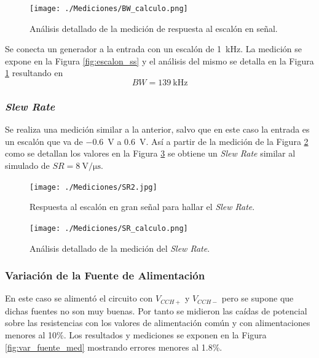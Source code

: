 		\begin{figure}[h!]
			\centering
			\texttt{[image: ./Mediciones/BW\_calculo.png]}
			\caption{Análisis detallado de la medición de respuesta al escalón en señal.}
			\label{fig:analisis_escalon_ss}
		\end{figure}

		Se conecta un generador a la entrada con un escalón de \SI{1}{\kHz}. La medición se expone en la Figura \ref{fig:escalon_ss} y el análisis del mismo se detalla en la Figura \ref{fig:analisis_escalon_ss} resultando en
		\begin{equation*}
			\boxed{BW = \SI{139}{\kHz}}
		\end{equation*}

		\subsubsection{\emph{Slew Rate}}
		Se realiza una medición similar a la anterior, salvo que en este caso la entrada es un escalón que va de \SI{-.6}{\V} a \SI{.6}{\V}. Así a partir de la medición de la Figura \ref{fig:sr_med} como se detallan los valores en la Figura \ref{fig:analisis_sr_med} se obtiene un \emph{Slew Rate} similar al simulado de $\boxed{SR = \SI{8}{\V\per\micro\second}}$.

		\begin{figure}[h!]
			\centering
			\texttt{[image: ./Mediciones/SR2.jpg]}
			\caption{Respuesta al escalón en gran señal para hallar el \emph{Slew Rate}.}
			\label{fig:sr_med}
		\end{figure}

		\begin{figure}[h!]
			\centering
			\texttt{[image: ./Mediciones/SR\_calculo.png]}
			\caption{Análisis detallado de la medición del \emph{Slew Rate}.}
			\label{fig:analisis_sr_med}
		\end{figure}

		\subsubsection{Variación de la Fuente de Alimentación}
		
		En este caso se alimentó el circuito con $V_{CCH+}$ y $V_{CCH-}$ pero se supone que dichas fuentes no son muy buenas. Por tanto se midieron las caídas de potencial sobre las resistencias con los valores de alimentación común y con alimentaciones menores al 10\%. Los resultados y mediciones se exponen en la Figura \ref{fig:var_fuente_med} mostrando errores menores al \num{1.8}\%.


